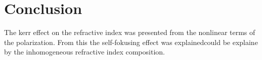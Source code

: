 \chapter{Conclusion}
\label{cha:conclusion}


The kerr effect on the refractive index was presented from the nonlinear terms of the polarization.
From this the self-fokusing effect was explainedcould be explaine by the inhomogeneous refractive index composition.



